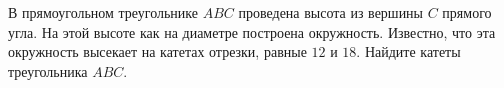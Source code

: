 \begin{ex}
	\begin{condition}
		В прямоугольном треугольнике \( ABC  \) проведена высота из вершины \( C  \) прямого угла. На этой высоте как на диаметре построена окружность. Известно, что эта окружность высекает на катетах отрезки, равные \( 12  \) и \( 18 \). Найдите катеты треугольника \( ABC \).
	\end{condition}
\end{ex}
